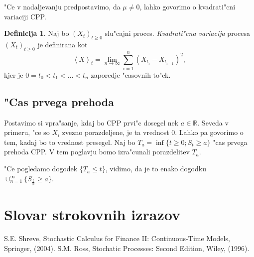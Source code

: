 \documentclass[12pt,a4paper]{amsart}
\theoremstyle{definition} %
\newtheorem{definicija}{Definicija}[section]
\theoremstyle{plain} %
\newcommand{\geslo}[2]{\noindent\textbf{#1}\hspace*{3mm}\hangindent=\parindent\hangafter=1 #2}
\newcommand{\R}{\mathbb{R}}
\newcommand{\1}{\mathds{1}}
\begin{document}
        "Ce v nadaljevanju predpostavimo, da $\mu \neq 0$, lahko govorimo o kvadrati"cni 
        variaciji CPP. 
        \begin{definicija}
            Naj bo $(X_t)_{t\geq0}$ slu"cajni proces. \textit{Kvadrati"cna variacija} procesa 
            $(X_t)_{t\geq0}$ je definirana kot 
            $$
                \left<X\right>_t = \lim_{n\to\infty}\sum_{i=1}^{n}\left(X_{t_i} - X_{t_{i-1}}\right)^2,
            $$
            kjer je $0 = t_0 < t_1 < \ldots < t_n$ zaporedje "casovnih to"ck.
            \label{def:kvadrVariacija}
        \end{definicija}

        \subsection{"Cas prvega prehoda}
        Postavimo si vpra"sanje, kdaj bo CPP prvi"c dosegel nek $a\in\R$. Seveda v primeru, "ce
        so $X_i$ zvezno porazdeljene, je ta vrednost $0$. Lahko pa govorimo o tem, kadaj bo to
        vrednost presegel. Naj bo $T_a = \inf\{t\geq0; S_t \geq a\}$ "cas prvega prehoda CPP. 
        V tem poglavju bomo izra"cunali porazdelitev $T_a$.

        "Ce pogledamo dogodek $\{T_a \leq t\}$, vidimo, da je to enako dogodku 
        $\cup_{n = 1}^\infty\{S_{\tfrac{t}{n}} \geq a\}$.
















\section*{Slovar strokovnih izrazov}

%
%


\begin{thebibliography}{99}

S.E. Shreve, Stochastic Calculus for Finance II: Continuous-Time Models, Springer, (2004).
S.M. Ross, Stochatic Processes: Second Edition, Wiley, (1996).
\end{thebibliography}
\end{document}
